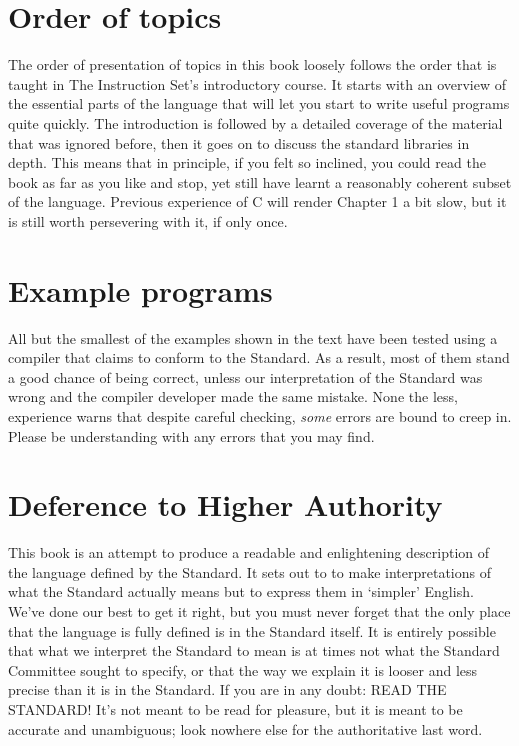  
        \section*{Order of topics}
        

  

  The order of presentation of topics in this book loosely follows the
   order that is taught in The Instruction Set's introductory course. It
   starts with an overview of the essential parts of the language that will
   let you start to write useful programs quite quickly. The introduction is
   followed by a detailed coverage of the material that was ignored before,
   then it goes on to discuss the standard libraries in depth. This means that
   in principle, if you felt so inclined, you could read the book as far as
   you like and stop, yet still have learnt a reasonably coherent subset of
   the language. Previous experience of C will render Chapter 1 a
   bit slow, but it is still worth persevering with it, if only once.


 
        \section*{Example programs}
        

  

  All but the smallest of the examples shown in the text have been tested
   using a compiler that claims to conform to the Standard. As a result, most
   of them stand a good chance of being correct, unless our interpretation of
   the Standard was wrong and the compiler developer made the same mistake.
   None the less, experience warns that despite careful checking,
   \textit{some} errors are bound to creep in. Please be understanding with
   any errors that you may find.


 
        \section*{Deference to Higher Authority}
        

  

  This book is an attempt to produce a readable and enlightening
   description of the language defined by the Standard. It sets out to to make
   interpretations of what the Standard actually means but to express them in
   `simpler' English. We've done our best to get it right, but you must
   never forget that the only place that the language is fully defined is in
   the Standard itself. It is entirely possible that what we interpret the
   Standard to mean is at times not what the Standard Committee sought to
   specify, or that the way we explain it is looser and less precise than it
   is in the Standard. If you are in any doubt: READ THE STANDARD! It's not
   meant to be read for pleasure, but it is meant to be accurate and
   unambiguous; look nowhere else for the authoritative last word.


